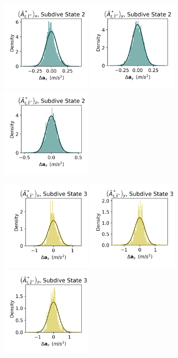 \documentclass{article}
\begin{document}
\begin{center}
        \includegraphics[width=1.75in]{../Plots/CarHHMM2_empirical_hist_Ax_1.png}
        \includegraphics[width=1.75in]{../Plots/CarHHMM2_empirical_hist_Ay_1.png}
        \includegraphics[width=1.75in]{../Plots/CarHHMM2_empirical_hist_Az_1.png}
        
        \includegraphics[width=1.75in]{../Plots/CarHHMM2_empirical_hist_Ax_2.png}
        \includegraphics[width=1.75in]{../Plots/CarHHMM2_empirical_hist_Ay_2.png}
        \includegraphics[width=1.75in]{../Plots/CarHHMM2_empirical_hist_Az_2.png}
        

\end{center}
\end{document}
